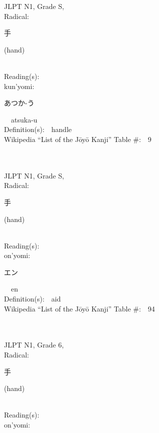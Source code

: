 \begin{multicols}{2}
{JLPT N1, Grade S, \\Radical:\ \ {\begin{CJK}{UTF8}{min} 手 \end{CJK}} (hand) } \\
Reading(s):\ \ \\
{\hspace*{1em}}kun'yomi:\ \ \\
{\hspace*{2em}}{\begin{CJK}{UTF8}{min} あつか-う \end{CJK}}\ \ atsuka-u\ \ \\
Definition(s):\ \ handle \\
Wikipedia ``List of the J\=oy\=o Kanji'' Table \#:\ \      9 \\
\ \ \\
{\fontsize{34pt}{40pt}  }\ \ \\
{JLPT N1, Grade S, \\Radical:\ \ {\begin{CJK}{UTF8}{min} 手 \end{CJK}} (hand) } \\
Reading(s):\ \ \\
{\hspace*{1em}}on'yomi:\ \ \\
{\hspace*{2em}}{\begin{CJK}{UTF8}{min} エン \end{CJK}}\ \ en\ \ \\
Definition(s):\ \ aid \\
Wikipedia ``List of the J\=oy\=o Kanji'' Table \#:\ \ 94 \\
\ \ \\
{\fontsize{34pt}{40pt}  }\ \ \\  %
{JLPT N1, Grade 6, \\Radical:\ \ {\begin{CJK}{UTF8}{min} 手 \end{CJK}} (hand) } \\
Reading(s):\ \ \\
{\hspace*{1em}}on'yomi:\ \ \\

\end{multicols}

